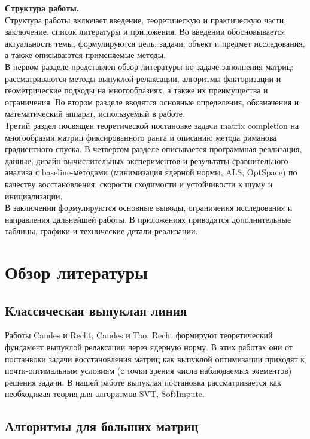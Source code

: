 \documentclass[a4paper,12pt]{article}
\begin{document}
\textbf{Структура работы.} \\[5pt]
Структура работы включает введение, теоретическую и практическую части, заключение, список литературы и приложения. Во введении обосновывается актуальность темы, формулируются цель, задачи, объект и предмет исследования, а также описываются применяемые методы. \\[5pt]
В первом разделе представлен обзор литературы по задаче заполнения матриц: рассматриваются методы выпуклой релаксации, алгоритмы факторизации и геометрические подходы на многообразиях, а также их преимущества и ограничения. Во втором разделе вводятся основные определения, обозначения и математический аппарат, используемый в работе. \\[5pt]
Третий раздел посвящен теоретической постановке задачи matrix completion на многообразии матриц фиксированного ранга и описанию метода риманова градиентного спуска. В четвертом разделе описывается программная реализация, данные, дизайн вычислительных экспериментов и результаты сравнительного анализа с baseline-методами (минимизация ядерной нормы, ALS, OptSpace) по качеству восстановления, скорости сходимости и устойчивости к шуму и инициализации. \\[25pt]
В заключении формулируются основные выводы, ограничения исследования и направления дальнейшей работы. В приложениях приводятся дополнительные таблицы, графики и технические детали реализации.

\newpage

\section{Обзор литературы}
\label{sec:literature}

\subsection{Классическая выпуклая линия}

Работы Candes и Recht, Candes и Tao, Recht формируют теоретический фундамент выпуклой релаксации через ядерную норму. В этих работах они от постанвоки задачи восстановления матриц как выпуклой оптимизации приходят к почти-оптимальным условиям (с точки зрения числа наблюдаемых элементов) решения задачи. В нашей работе выпуклая постановка рассматривается как необходимая теория для алгоритмов SVT, SoftImpute.

\subsection{Алгоритмы для больших матриц}
\end{document}
